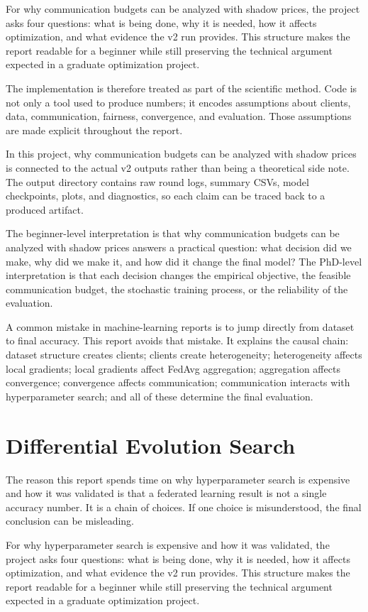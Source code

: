 \documentclass[11pt]{report}
\begin{document}
For why communication budgets can be analyzed with shadow prices, the project asks four questions:
what is being done, why it is needed, how it affects optimization, and what evidence the v2 run
provides. This structure makes the report readable for a beginner while still preserving the
technical argument expected in a graduate optimization project.

The implementation is therefore treated as part of the scientific method. Code is not only a tool
used to produce numbers; it encodes assumptions about clients, data, communication, fairness,
convergence, and evaluation. Those assumptions are made explicit throughout the report.

In this project, why communication budgets can be analyzed with shadow prices is connected to the
actual v2 outputs rather than being a theoretical side note. The output directory contains raw round
logs, summary CSVs, model checkpoints, plots, and diagnostics, so each claim can be traced back to a
produced artifact.

The beginner-level interpretation is that why communication budgets can be analyzed with shadow
prices answers a practical question: what decision did we make, why did we make it, and how did it
change the final model? The PhD-level interpretation is that each decision changes the empirical
objective, the feasible communication budget, the stochastic training process, or the reliability of
the evaluation.

A common mistake in machine-learning reports is to jump directly from dataset to final accuracy.
This report avoids that mistake. It explains the causal chain: dataset structure creates clients;
clients create heterogeneity; heterogeneity affects local gradients; local gradients affect FedAvg
aggregation; aggregation affects convergence; convergence affects communication; communication
interacts with hyperparameter search; and all of these determine the final evaluation.

\chapter{Differential Evolution Search}
The reason this report spends time on why hyperparameter search is expensive and how it was
validated is that a federated learning result is not a single accuracy number. It is a chain of
choices. If one choice is misunderstood, the final conclusion can be misleading.

For why hyperparameter search is expensive and how it was validated, the project asks four
questions: what is being done, why it is needed, how it affects optimization, and what evidence the
v2 run provides. This structure makes the report readable for a beginner while still preserving the
technical argument expected in a graduate optimization project.
\end{document}

